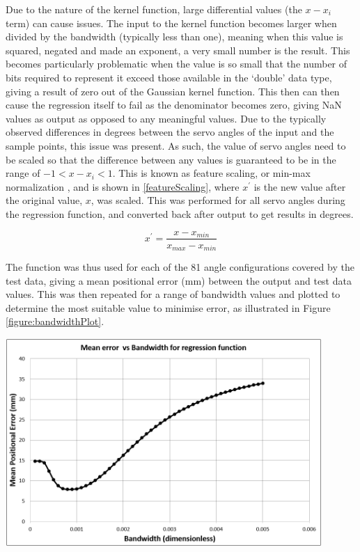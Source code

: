 \documentclass[11pt]{article}
\begin{document}
Due to the nature of the kernel function, large differential values (the $x - x_{i}$ term) can cause issues. The input to the kernel function becomes larger when divided by the bandwidth (typically less than one), meaning when this value is squared, negated and made an exponent, a very small number is the result. This becomes particularly problematic when the value is so small that the number of bits required to represent it exceed those available in the `double' data type, giving a result of zero out of the Gaussian kernel function. This then can then cause the regression itself to fail as the denominator becomes zero, giving NaN values as output as opposed to any meaningful values. Due to the typically observed differences in degrees between the servo angles of the input and the sample points, this issue was present. As such, the value of servo angles need to be scaled so that the difference between any values is guaranteed to be in the range of $-1 < x - x_{i} < 1$. This is known as feature scaling, or min-max normalization \cite{mohamad2013}, and is shown in \eqref{featureScaling}, where $x^{\prime}$ is the new value after the original value, $x$, was scaled. This was performed for all servo angles during the regression function, and converted back after output to get results in degrees.

\begin{equation}\label{featureScaling}
x^{\prime} = \frac{x - x_{min}}{x_{max} - x_{min}}
\end{equation}

The function was thus used for each of the 81 angle configurations covered by the test data, giving a mean positional error (mm) between the output and test data values. This was then repeated for a range of bandwidth values and plotted to determine the most suitable value to minimise error, as illustrated in Figure \ref{figure:bandwidthPlot}.


\begin{center}
\includegraphics[width=0.9\textwidth]{images/bandwidthPlot.png}
\label{figure:bandwidthPlot}
\end{center}
\end{document}
